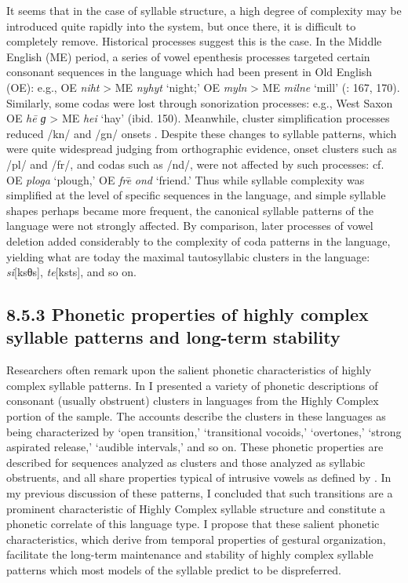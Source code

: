   It seems that in the case of syllable structure, a high degree of complexity may be introduced quite rapidly into the system, but once there, it is difficult to completely remove. Historical processes suggest this is the case. In the Middle English (ME) period, a series of vowel epenthesis processes targeted certain consonant sequences in the language which had been present in Old English (OE): e.g., OE \textit{niht} > ME \textit{nyhyt} ‘night;’ OE \textit{myln} > ME \textit{milne} ‘mill’ (\citealt{Jones1989}: 167, 170). Similarly, some codas were lost through sonorization processes: e.g., West Saxon OE \textit{he\={} ɡ} > ME \textit{hei} ‘hay’ (ibid. 150). Meanwhile, cluster simplification processes reduced /kn/ and /gn/ onsets \citep{Minkova2003}. Despite these changes to syllable patterns, which were quite widespread judging from orthographic evidence, onset clusters such as /pl/ and /fr/, and codas such as /nd/, were not affected by such processes: cf. OE \textit{ploga} ‘plough,’ OE \textit{fre}\textsf{\={} }\textit{ond} ‘friend.’ Thus while syllable complexity was simplified at the level of specific sequences in the language, and simple syllable shapes perhaps became more frequent, the canonical syllable patterns of the language were not strongly affected. By comparison, later processes of vowel deletion added considerably to the complexity of coda patterns in the language, yielding what are today the maximal tautosyllabic clusters in the language: \textit{si}[ksθs], \textit{te}[ksts], and so on.


\subsection{8.5.3 Phonetic properties of highly complex syllable patterns and long-term stability}

  Researchers often remark upon the salient phonetic characteristics of highly complex syllable patterns. In  I presented a variety of phonetic descriptions of consonant (usually obstruent) clusters in languages from the Highly Complex portion of the sample. The accounts describe the clusters in these languages as being characterized by ‘open transition,’ ‘transitional vocoids,’ ‘overtones,’ ‘strong aspirated release,’ ‘audible intervals,’ and so on. These phonetic properties are described for sequences analyzed as clusters and those analyzed as syllabic obstruents, and all share properties typical of intrusive vowels as defined by \citet{Hall2006}. In my previous discussion of these patterns, I concluded that such transitions are a prominent characteristic of Highly Complex syllable structure and constitute a phonetic correlate of this language type. I propose that these salient phonetic characteristics, which derive from temporal properties of gestural organization, facilitate the long-term maintenance and stability of highly complex syllable patterns which most models of the syllable predict to be dispreferred.



